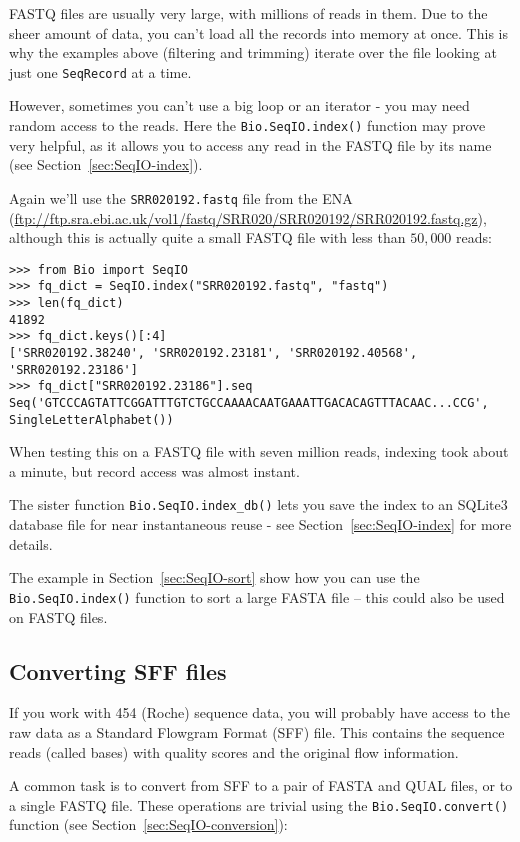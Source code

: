 FASTQ files are usually very large, with millions of reads in them. Due to the
sheer amount of data, you can't load all the records into memory at once.
This is why the examples above (filtering and trimming) iterate over the file
looking at just one \verb|SeqRecord| at a time.

However, sometimes you can't use a big loop or an iterator - you may need
random access to the reads. Here the \verb|Bio.SeqIO.index()| function
may prove very helpful, as it allows you to access any read in the FASTQ file
by its name (see Section~\ref{sec:SeqIO-index}).

Again we'll use the \texttt{SRR020192.fastq} file from the ENA
(\url{ftp://ftp.sra.ebi.ac.uk/vol1/fastq/SRR020/SRR020192/SRR020192.fastq.gz}),
although this is actually quite a small FASTQ file with less than $50,000$ reads:

\begin{verbatim}
>>> from Bio import SeqIO
>>> fq_dict = SeqIO.index("SRR020192.fastq", "fastq")
>>> len(fq_dict)
41892
>>> fq_dict.keys()[:4]
['SRR020192.38240', 'SRR020192.23181', 'SRR020192.40568', 'SRR020192.23186']
>>> fq_dict["SRR020192.23186"].seq
Seq('GTCCCAGTATTCGGATTTGTCTGCCAAAACAATGAAATTGACACAGTTTACAAC...CCG', SingleLetterAlphabet())
\end{verbatim}

When testing this on a FASTQ file with seven million reads,
indexing took about a minute, but record access was almost instant.

The sister function \verb|Bio.SeqIO.index_db()| lets you save the index
to an SQLite3 database file for near instantaneous reuse - see
Section~\ref{sec:SeqIO-index} for more details.

The example in Section~\ref{sec:SeqIO-sort} show how you can use the
\verb|Bio.SeqIO.index()| function to sort a large FASTA file -- this
could also be used on FASTQ files.

\subsection{Converting SFF files}
\label{sec:SeqIO-sff-conversion}

If you work with 454 (Roche) sequence data, you will probably have access
to the raw data as a Standard Flowgram Format (SFF) file. This contains
the sequence reads (called bases) with quality scores and the original
flow information.

A common task is to convert from SFF to a pair of FASTA and QUAL files,
or to a single FASTQ file. These operations are trivial using the
\verb|Bio.SeqIO.convert()| function (see Section~\ref{sec:SeqIO-conversion}):

